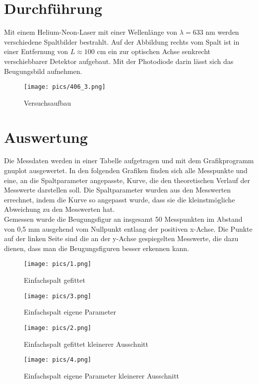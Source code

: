 \section{Durchführung}
Mit einem Helium-Neon-Laser mit einer Wellenlänge von $\lambda = 633$ nm werden verschiedene Spaltbilder bestrahlt.
Auf der Abbildung rechts vom Spalt ist in einer Entfernung von $L\approx 100$ cm ein zur optischen Achse senkrecht 
verschiebbarer Detektor aufgebaut. Mit der Photodiode darin lässt sich das Beugungsbild aufnehmen.

\begin{figure}[htbp]
\texttt{[image: pics/406\_3.png]}
\centering
\caption{Versuchsaufbau}
\end{figure}

\section{Auswertung}
Die Messdaten werden in einer Tabelle aufgetragen und mit dem Grafikprogramm gnuplot ausgewertet. In den folgenden Grafiken finden sich alle Messpunkte und eine, an die Spaltparameter angepasste, Kurve, die den theoretischen Verlauf der Messwerte darstellen soll. Die Spaltparameter wurden aus den Messwerten errechnet, indem die Kurve so angepasst wurde, dass sie die kleinstmögliche Abweichung zu den Messwerten hat.\\
Gemessen wurde die Beugungsfigur an insgesamt 50 Messpunkten im Abstand von 0,5 mm ausgehend vom Nullpunkt entlang der positiven x-Achse. Die Punkte auf der linken Seite sind die an der y-Achse gespiegelten Messwerte, die dazu dienen, dass man die Beugungsfiguren besser erkennen kann.

\begin{figure}[htbp]
\texttt{[image: pics/1.png]}
\centering
\label{a1}
\caption{Einfachspalt gefittet}
\end{figure}

\begin{figure}[htbp]
\texttt{[image: pics/3.png]}
\centering
\label{a2}
\caption{Einfachspalt eigene Parameter}
\end{figure}


\begin{figure}[htbp]
\texttt{[image: pics/2.png]}
\centering
\label{a3}
\caption{Einfachspalt gefittet kleinerer Ausschnitt}
\end{figure}

\begin{figure}[htbp]
\texttt{[image: pics/4.png]}
\centering
\label{a4}
\caption{Einfachspalt eigene Parameter kleinerer Ausschnitt}
\end{figure}


